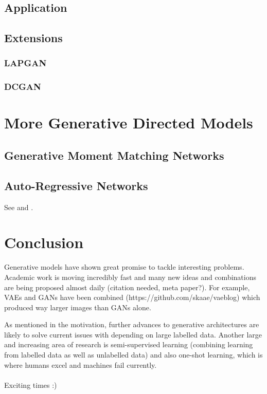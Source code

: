 \documentclass[twoside,11pt,a4paper]{article}
\theoremstyle{break}
\begin{document}
\subsection{Application}
\label{sub:gan_application}

\subsection{Extensions}
\label{sub:gan_extensions}

\subsubsection{LAPGAN}
\label{ssub:lapgan}

\subsubsection{DCGAN}
\label{ssub:dcgan}





\section{More Generative Directed Models}
\label{sec:more}

\subsection{Generative Moment Matching Networks}
\label{sub:more_mmn}

\subsection{Auto-Regressive Networks}
\label{sub:more_arn}

See \cite{gan_openai:2016} and \cite{gan_training:2016}.


\section{Conclusion}
\label{sec:conclusion}

Generative models have shown great promise to tackle interesting problems.
Academic work is moving incredibly fast and many new ideas and combinations
are being proposed almost daily (citation needed, meta paper?).
For example, VAEs and GANs have been combined (https://github.com/skaae/vaeblog)
which produced way larger images than GANs alone.

As mentioned in the motivation, further advances to generative architectures are
likely to solve current issues with depending on large labelled data.
Another large and increasing area of research is semi-supervised learning
(combining learning from labelled data as well as unlabelled data)
and also one-shot learning, which is where humans excel and machines fail currently.
\\\\
Exciting times :)



\end{document}
